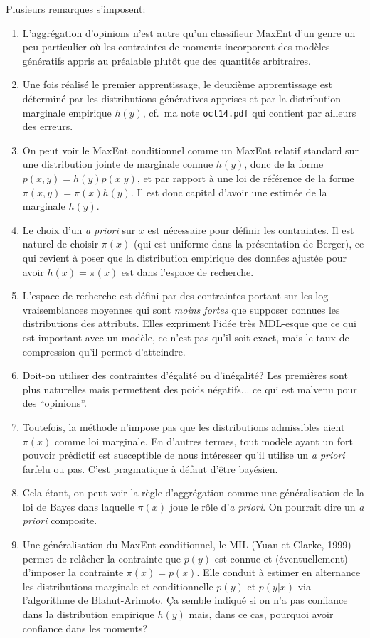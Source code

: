 \documentclass{article}
\begin{document}
Plusieurs remarques s'imposent:
\begin{enumerate}
    \item L'aggr\'egation d'opinions n'est autre qu'un classifieur MaxEnt d'un genre un peu particulier o\`u les contraintes de moments incorporent des mod\`eles g\'en\'eratifs appris au pr\'ealable plut\^ot que des quantit\'es arbitraires.
    \item  Une fois r\'ealis\'e le premier apprentissage, le deuxi\`eme apprentissage est d\'etermin\'e par les distributions g\'en\'eratives apprises et par la distribution marginale empirique $h(y)$, cf.~ma note {\tt oct14.pdf} qui contient par ailleurs des erreurs.
    \item On peut voir le MaxEnt conditionnel comme un MaxEnt relatif standard sur une distribution jointe de marginale connue $h(y)$, donc de la forme $p(x,y)=h(y)p(x|y)$, et par rapport \`a une loi de r\'ef\'erence de la forme $\pi(x,y)=\pi(x)h(y)$. Il est donc capital d'avoir une estim\'ee de la marginale $h(y)$.
    \item Le choix d'un {\em a priori} sur $x$ est n\'ecessaire pour d\'efinir les contraintes. Il est naturel de choisir $\pi(x)$ (qui est uniforme dans la pr\'esentation de Berger), ce qui revient \`a poser que la distribution empirique des donn\'ees ajust\'ee pour avoir $h(x)=\pi(x)$ est dans l'espace de recherche.
    \item L'espace de recherche est d\'efini par des contraintes portant sur les log-vraisemblances moyennes  qui sont {\em moins fortes} que supposer connues les distributions des attributs. Elles expriment l'id\'ee tr\`es MDL-esque que ce qui est important avec un mod\`ele, ce n'est pas qu'il soit exact, mais le taux de compression qu'il permet d'atteindre. 
    \item Doit-on utiliser des contraintes d'\'egalit\'e ou d'in\'egalit\'e? Les premi\`eres sont plus naturelles mais permettent des poids n\'egatifs... ce qui est malvenu pour des ``opinions''. 
    \item Toutefois, la m\'ethode n'impose pas que les distributions admissibles aient $\pi(x)$ comme loi marginale. En d'autres termes, tout mod\`ele ayant un fort pouvoir pr\'edictif est susceptible de nous int\'eresser qu'il utilise un {\em a priori} farfelu ou pas. C'est pragmatique \`a d\'efaut d'\^etre bay\'esien.
    \item Cela \'etant, on peut voir la r\`egle d'aggr\'egation comme une g\'en\'eralisation de la loi de Bayes dans laquelle $\pi(x)$ joue le r\^ole d'{\em a priori}. On pourrait dire un {\em a priori} composite.
    \item Une g\'en\'eralisation du MaxEnt conditionnel, le MIL (Yuan et Clarke, 1999) permet de rel\^acher la contrainte que $p(y)$ est connue et (\'eventuellement) d'imposer la contrainte $\pi(x)=p(x)$. Elle conduit \`a estimer en alternance les distributions marginale et conditionnelle $p(y)$ et $p(y|x)$ via l'algorithme de Blahut-Arimoto. \c Ca semble indiqu\'e si on n'a pas confiance dans la distribution empirique $h(y)$ mais, dans ce cas, pourquoi avoir confiance dans les moments? 
\end{enumerate}
\end{document}

